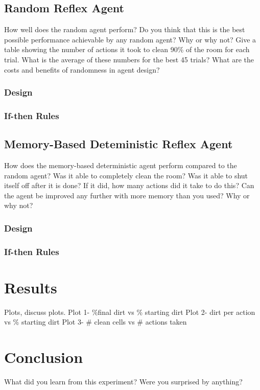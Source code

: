 \documentclass[a4paper,10pt]{article}
\begin{document}
\subsection{Random Reflex Agent}
How well does the random agent perform? Do you think that this is the best possible performance achievable by any random agent? Why or why not? Give a table showing the number of actions it took to clean 90\% of the room for each trial. What is the average of these numbers for the best 45 trials? What are the costs and benefits of randomness in agent design?
\subsubsection{Design}
\subsubsection{If-then Rules}

\subsection{Memory-Based Deteministic Reflex Agent}
How does the memory-based deterministic agent perform compared to the random agent? Was it able to completely clean the room? Was it able to shut itself off after it is done? If it did, how many actions did it take to do this? Can the agent be improved any further with more memory than you used? Why or why not?
\subsubsection{Design}
\subsubsection{If-then Rules}

\section{Results}
Plots, discuss plots.
Plot 1- \%final dirt vs \% starting dirt
Plot 2- dirt per action vs \% starting dirt
Plot 3- \# clean cells vs \# actions taken

\section{Conclusion}
What did you learn from this experiment? Were you surprised by anything?
\end{document}
